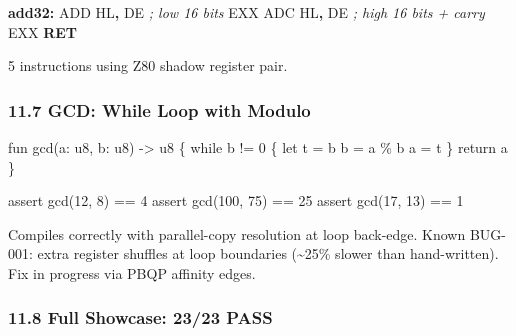 \documentclass[
  11pt,
  a4paper,
]{report}
\newenvironment{Shaded}{\begin{snugshade}\small}{\end{snugshade}}
\newcommand{\BuiltInTok}[1]{#1}
\newcommand{\CommentTok}[1]{\textcolor[rgb]{0.56,0.35,0.01}{\textit{#1}}}
\newcommand{\ControlFlowTok}[1]{\textcolor[rgb]{0.13,0.29,0.53}{\textbf{#1}}}
\newcommand{\FunctionTok}[1]{\textcolor[rgb]{0.13,0.29,0.53}{\textbf{#1}}}
\newcommand{\NormalTok}[1]{#1}
\newcommand{\OperatorTok}[1]{\textcolor[rgb]{0.81,0.36,0.00}{\textbf{#1}}}
\begin{document}
\begin{Shaded}
\begin{Highlighting}[]
\FunctionTok{add32:}
    \BuiltInTok{ADD}\NormalTok{ HL}\OperatorTok{,}\NormalTok{ DE      }\CommentTok{; low 16 bits}
\NormalTok{    EXX}
    \BuiltInTok{ADC}\NormalTok{ HL}\OperatorTok{,}\NormalTok{ DE      }\CommentTok{; high 16 bits + carry}
\NormalTok{    EXX}
    \ControlFlowTok{RET}
\end{Highlighting}
\end{Shaded}

5 instructions using Z80 shadow register pair.

\subsubsection{11.7 GCD: While Loop with
Modulo}\label{gcd-while-loop-with-modulo}

\begin{Shaded}
\begin{Highlighting}[]
\NormalTok{fun gcd(a: u8, b: u8) {-}\textgreater{} u8 \{}
\NormalTok{    while b != 0 \{}
\NormalTok{        let t = b}
\NormalTok{        b = a \% b}
\NormalTok{        a = t}
\NormalTok{    \}}
\NormalTok{    return a}
\NormalTok{\}}

\NormalTok{assert gcd(12, 8) == 4}
\NormalTok{assert gcd(100, 75) == 25}
\NormalTok{assert gcd(17, 13) == 1}
\end{Highlighting}
\end{Shaded}

Compiles correctly with parallel-copy resolution at loop back-edge.
Known BUG-001: extra register shuffles at loop boundaries
(\textasciitilde25\% slower than hand-written). Fix in progress via PBQP
affinity edges.

\subsubsection{11.8 Full Showcase: 23/23
PASS}\label{full-showcase-2323-pass}
\end{document}
